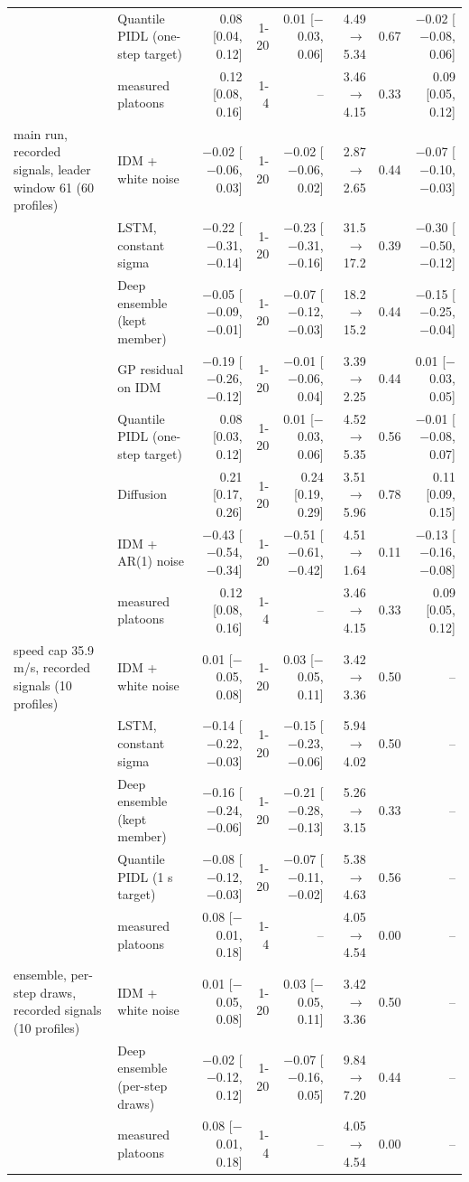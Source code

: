 \begin{longtable}{llrrrrrr}
 & Quantile PIDL (one-step target) & 0.08 [0.04, 0.12] & 1-20 & 0.01 [$-$0.03, 0.06] & 4.49 $\rightarrow$ 5.34 & 0.67 & $-$0.02 [$-$0.08, 0.06] \\
 & measured platoons & 0.12 [0.08, 0.16] & 1-4 & -- & 3.46 $\rightarrow$ 4.15 & 0.33 & 0.09 [0.05, 0.12] \\
\midrule
main run, recorded signals, leader window 61 (60 profiles) & IDM + white noise & $-$0.02 [$-$0.06, 0.03] & 1-20 & $-$0.02 [$-$0.06, 0.02] & 2.87 $\rightarrow$ 2.65 & 0.44 & $-$0.07 [$-$0.10, $-$0.03] \\
 & LSTM, constant sigma & $-$0.22 [$-$0.31, $-$0.14] & 1-20 & $-$0.23 [$-$0.31, $-$0.16] & 31.5 $\rightarrow$ 17.2 & 0.39 & $-$0.30 [$-$0.50, $-$0.12] \\
 & Deep ensemble (kept member) & $-$0.05 [$-$0.09, $-$0.01] & 1-20 & $-$0.07 [$-$0.12, $-$0.03] & 18.2 $\rightarrow$ 15.2 & 0.44 & $-$0.15 [$-$0.25, $-$0.04] \\
 & GP residual on IDM & $-$0.19 [$-$0.26, $-$0.12] & 1-20 & $-$0.01 [$-$0.06, 0.04] & 3.39 $\rightarrow$ 2.25 & 0.44 & 0.01 [$-$0.03, 0.05] \\
 & Quantile PIDL (one-step target) & 0.08 [0.03, 0.12] & 1-20 & 0.01 [$-$0.03, 0.06] & 4.52 $\rightarrow$ 5.35 & 0.56 & $-$0.01 [$-$0.08, 0.07] \\
 & Diffusion & 0.21 [0.17, 0.26] & 1-20 & 0.24 [0.19, 0.29] & 3.51 $\rightarrow$ 5.96 & 0.78 & 0.11 [0.09, 0.15] \\
 & IDM + AR(1) noise & $-$0.43 [$-$0.54, $-$0.34] & 1-20 & $-$0.51 [$-$0.61, $-$0.42] & 4.51 $\rightarrow$ 1.64 & 0.11 & $-$0.13 [$-$0.16, $-$0.08] \\
 & measured platoons & 0.12 [0.08, 0.16] & 1-4 & -- & 3.46 $\rightarrow$ 4.15 & 0.33 & 0.09 [0.05, 0.12] \\
\midrule
speed cap 35.9 m/s, recorded signals (10 profiles) & IDM + white noise & 0.01 [$-$0.05, 0.08] & 1-20 & 0.03 [$-$0.05, 0.11] & 3.42 $\rightarrow$ 3.36 & 0.50 & -- \\
 & LSTM, constant sigma & $-$0.14 [$-$0.22, $-$0.03] & 1-20 & $-$0.15 [$-$0.23, $-$0.06] & 5.94 $\rightarrow$ 4.02 & 0.50 & -- \\
 & Deep ensemble (kept member) & $-$0.16 [$-$0.24, $-$0.06] & 1-20 & $-$0.21 [$-$0.28, $-$0.13] & 5.26 $\rightarrow$ 3.15 & 0.33 & -- \\
 & Quantile PIDL (1 s target) & $-$0.08 [$-$0.12, $-$0.03] & 1-20 & $-$0.07 [$-$0.11, $-$0.02] & 5.38 $\rightarrow$ 4.63 & 0.56 & -- \\
 & measured platoons & 0.08 [$-$0.01, 0.18] & 1-4 & -- & 4.05 $\rightarrow$ 4.54 & 0.00 & -- \\
\midrule
ensemble, per-step draws, recorded signals (10 profiles) & IDM + white noise & 0.01 [$-$0.05, 0.08] & 1-20 & 0.03 [$-$0.05, 0.11] & 3.42 $\rightarrow$ 3.36 & 0.50 & -- \\
 & Deep ensemble (per-step draws) & $-$0.02 [$-$0.12, 0.12] & 1-20 & $-$0.07 [$-$0.16, 0.05] & 9.84 $\rightarrow$ 7.20 & 0.44 & -- \\
 & measured platoons & 0.08 [$-$0.01, 0.18] & 1-4 & -- & 4.05 $\rightarrow$ 4.54 & 0.00 & -- \\
\end{longtable}
\endgroup
